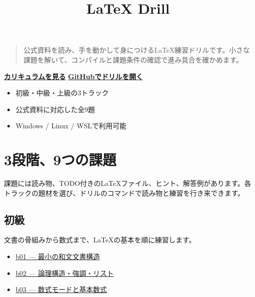 \documentclass[12pt]{article}
\title{LaTeX Drill}
\author{}
\date{}
\begin{document}

\maketitle

\begin{quote}
公式資料を読み、手を動かして身につけるLaTeX練習ドリルです。小さな課題を解いて、コンパイルと課題条件の確認で進み具合を確かめます。
\end{quote}

\href{#curriculum}{\textbf{カリキュラムを見る}}
\qquad
\href{https://github.com/Nyanziba/latex-drill}{\textbf{GitHubでドリルを開く}}

\begin{itemize}
  \item 初級・中級・上級の3トラック
  \item 公式資料に対応した全9題
  \item Windows / Linux / WSLで利用可能
\end{itemize}

\hypertarget{curriculum}{}
\section*{3段階、9つの課題}

課題には読み物、TODO付きのLaTeXファイル、ヒント、解答例があります。各トラックの題材を選び、ドリルのコマンドで読み物と練習を行き来できます。

\subsection*{初級}
文書の骨組みから数式まで、LaTeXの基本を順に練習します。
\begin{itemize}
  \item \href{lessons/beginner/b01.html}{b01 — 最小の和文文書構造}
  \item \href{lessons/beginner/b02.html}{b02 — 論理構造・強調・リスト}
  \item \href{lessons/beginner/b03.html}{b03 — 数式モードと基本数式}
\end{itemize}
\end{document}
